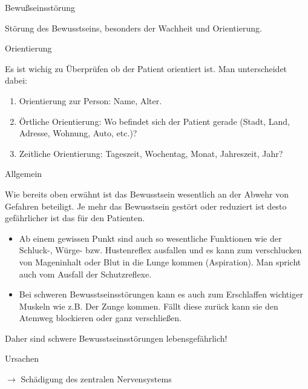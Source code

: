 \documentclass{article}
\begin{document}
Bewu{\ss}seinsst\"orung

St\"orung des Bewusstseins, besonders der Wachheit und Orientierung. 

Orientierung

Es ist wichig zu \"Uberpr\"ufen ob der Patient orientiert ist. Man
unterscheidet dabei: 

\begin{enumerate}
\item Orientierung zur Person: Name, Alter. 

\item \"Ortliche Orientierung: Wo befindet sich der Patient gerade
(Stadt, Land, Adresse, Wohnung, Auto, etc.)?

\item Zeitliche Orientierung: Tageszeit, Wochentag, Monat, Jahreszeit,
Jahr? 

\end{enumerate}
Allgemein

Wie bereits oben erw\"ahnt ist das Bewusstsein wesentlich an der Abwehr
von Gefahren beteiligt. Je mehr das Bewusstsein gest\"ort oder
reduziert ist desto gef\"ahrlicher ist das f\"ur den Patienten. 

\begin{itemize}
\item Ab einem gewissen Punkt sind auch so wesentliche Funktionen wie
der Schluck-, W\"urge- bzw. Hustenreflex ausfallen und es kann zum
verschlucken von Mageninhalt oder Blut in die Lunge kommen
(Aspiration). Man spricht auch vom Ausfall der Schutzreflexe. 

\item Bei schweren Bewusstseinsst\"orungen kann es auch zum Erschlaffen
wichtiger Muskeln wie z.B. Der Zunge kommen. F\"allt diese zur\"uck
kann sie den Atemweg blockieren oder ganz verschlie{\ss}en. 

\end{itemize}
Daher sind schwere Bewusstseinsst\"orungen lebensgef\"ahrlich!

Ursachen

${\rightarrow}$ Sch\"adigung des zentralen Nervensystems
\end{document}
